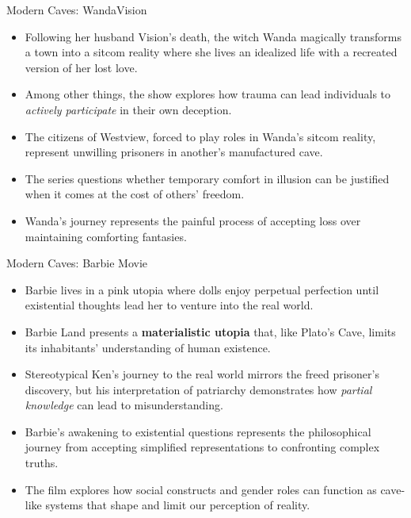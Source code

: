 \documentclass[aspectratio=169]{beamer}
\begin{document}
    \begin{frame}{Modern Caves: WandaVision}
        \begin{itemize}
        \item Following her husband Vision's death, the witch Wanda magically transforms a town into a sitcom reality where she lives an idealized life with a recreated version of her lost love.
        \item Among other things, the show explores how trauma can lead individuals to \emph{actively participate} in their own deception.
        \item The citizens of Westview, forced to play roles in Wanda's sitcom reality, represent unwilling prisoners in another's manufactured cave.
        \item The series questions whether temporary comfort in illusion can be justified when it comes at the cost of others' freedom.
        \item Wanda's journey represents the painful process of accepting loss over maintaining comforting fantasies.
        \end{itemize}
    \end{frame}

    \begin{frame}{Modern Caves: Barbie Movie}
        \begin{itemize}
        \item Barbie lives in a pink utopia where dolls enjoy perpetual perfection until existential thoughts lead her to venture into the real world.
        \item Barbie Land presents a \textbf{materialistic utopia} that, like Plato's Cave, limits its inhabitants' understanding of human existence.
        \item Stereotypical Ken's journey to the real world mirrors the freed prisoner's discovery, but his interpretation of patriarchy demonstrates how \emph{partial knowledge} can lead to misunderstanding.
        \item Barbie's awakening to existential questions represents the philosophical journey from accepting simplified representations to confronting complex truths.
        \item The film explores how social constructs and gender roles can function as cave-like systems that shape and limit our perception of reality.
        \end{itemize}
    \end{frame}
\end{document}
